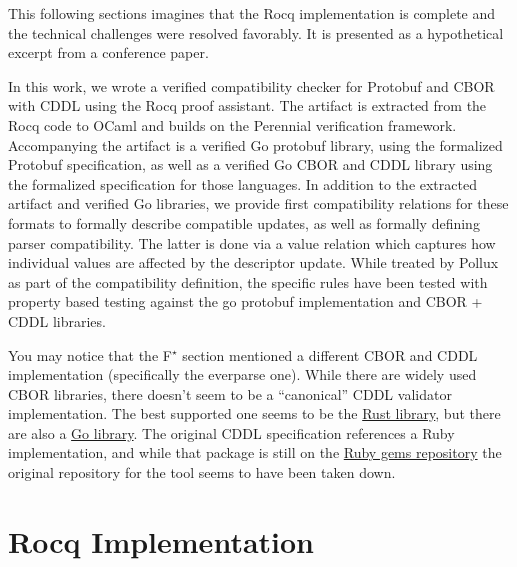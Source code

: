 \documentclass[11pt]{article}
\newcommand{\fstar}{F$^\star$}
\begin{document}
\begin{info}
  This following sections imagines that the Rocq implementation is complete
  and the technical challenges were resolved favorably. It is presented as a
  hypothetical excerpt from a conference paper.
\end{info}

In this work, we wrote a verified compatibility checker for Protobuf and CBOR
with CDDL using the Rocq proof assistant. The artifact is extracted from the
Rocq code to OCaml and builds on the Perennial verification
framework. Accompanying the artifact is a verified Go protobuf library, using
the formalized Protobuf specification, as well as a verified Go CBOR and CDDL
library using the formalized specification for those languages. In addition to
the extracted artifact and verified Go libraries, we provide first compatibility
relations for these formats to formally describe compatible updates, as well as
formally defining parser compatibility. The latter is done via a value relation
which captures how individual values are affected by the descriptor
update. While treated by Pollux as part of the compatibility definition, the
specific rules have been tested with property based testing against the go
protobuf implementation and CBOR + CDDL libraries.

\begin{info}
  You may notice that the \fstar{} section mentioned a different CBOR and CDDL
  implementation (specifically the everparse one). While there are widely used
  CBOR libraries, there doesn't seem to be a ``canonical'' CDDL validator
  implementation. The best supported one seems to be the
  \href{https://github.com/anweiss/cddl}{Rust library}, but there are also a
  \href{https://github.com/HannesKimara/cddlc}{Go library}. The original CDDL
  specification \cite{birkholzConciseDataDefinition2019} references a Ruby
  implementation, and while that package is still on the
  \href{https://rubygems.org/gems/cddl/versions/0.8.8}{Ruby gems repository} the
  original repository for the tool seems to have been taken down.
\end{info}

\section{Rocq Implementation}
\end{document}

